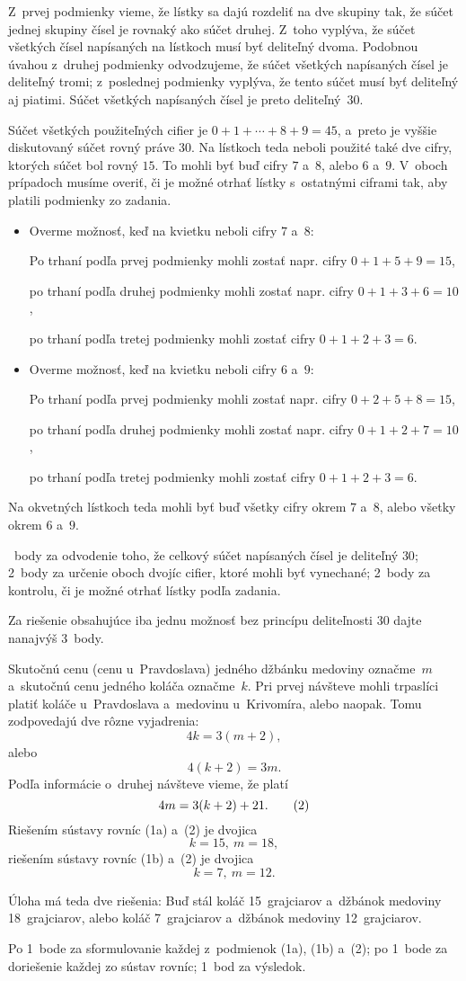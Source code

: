 {%
Z~prvej podmienky vieme, že lístky sa dajú rozdeliť na dve skupiny tak, že súčet
jednej skupiny čísel je rovnaký ako súčet druhej.
Z~toho vyplýva, že súčet všetkých čísel napísaných na lístkoch musí
byť deliteľný dvoma.
Podobnou úvahou z~druhej podmienky odvodzujeme, že súčet všetkých
napísaných čísel je deliteľný tromi; z~poslednej podmienky vyplýva, že tento
súčet musí byť deliteľný aj piatimi.
Súčet všetkých napísaných čísel je preto deliteľný~$30$.

Súčet všetkých použiteľných cifier je $0+1+\cdots+8+9=45$, a~preto
je vyššie diskutovaný súčet rovný práve $30$.
Na lístkoch teda neboli použité také dve cifry, ktorých súčet bol
rovný $15$.
To mohli byť buď cifry $7$ a~$8$, alebo $6$ a~$9$.
V~oboch prípadoch musíme overiť, či je možné otrhať lístky s~ostatnými
ciframi tak, aby platili podmienky zo zadania.
\begin{itemize}
\item
Overme možnosť, keď na kvietku neboli cifry $7$ a~$8$:

Po trhaní podľa prvej podmienky mohli zostať napr. cifry $0+1+5+9=15$,

po trhaní podľa druhej podmienky mohli zostať napr. cifry $0+1+3+6=10$,

po trhaní podľa tretej podmienky mohli zostať cifry $0+1+2+3=6$.
\item Overme možnosť, keď na kvietku neboli cifry $6$ a~$9$:

Po trhaní podľa prvej podmienky mohli zostať napr. cifry $0+2+5+8=15$,

po trhaní podľa druhej podmienky mohli zostať napr. cifry $0+1+2+7=10$,

po trhaní podľa tretej podmienky mohli zostať cifry $0+1+2+3=6$.
\end{itemize}
Na okvetných lístkoch teda mohli byť buď všetky cifry okrem $7$ a~$8$, alebo
všetky okrem $6$ a~$9$.

~body za odvodenie toho, že celkový súčet napísaných čísel je deliteľný $30$;
2~body za určenie oboch dvojíc cifier, ktoré mohli byť vynechané;
2~body za kontrolu, či je možné otrhať lístky podľa zadania.

Za riešenie obsahujúce iba jednu možnosť bez princípu deliteľnosti $30$ dajte nanajvýš 3~body.
\endhodnotenie
}

{%
Skutočnú cenu (cenu u~Pravdoslava) jedného džbánku medoviny
označme~$m$ a~skutočnú cenu jedného koláča označme~$k$. Pri prvej
návšteve mohli trpaslíci platiť koláče u~Pravdoslava a~medovinu
u~Krivomíra, alebo naopak. Tomu zodpovedajú dve rôzne vyjadrenia:
$$
4k=3(m+2),
\tag{1a}
$$
alebo
$$
4(k+2)=3m.
\tag{1b}
$$
Podľa informácie o~druhej návšteve vieme, že platí
$$
4m=3(k+2)+21.
\tag2
$$
Riešením sústavy rovníc (1a) a~(2) je dvojica
$$k=15,\ m=18,
$$
riešením sústavy rovníc (1b) a~(2) je dvojica
$$k=7,\ m=12.
$$

Úloha má teda dve riešenia: Buď stál koláč 15~grajciarov a~džbánok medoviny 18~grajciarov, alebo koláč 7~grajciarov a~džbánok medoviny 12~grajciarov.

\hodnotenie
Po 1~bode za sformulovanie každej z~podmienok (1a), (1b) a~(2);
po 1~bode za doriešenie každej zo sústav rovníc;
1~bod za výsledok.
\endhodnotenie
}

